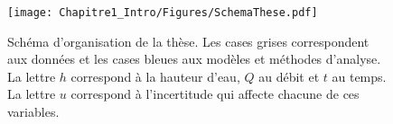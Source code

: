 \begin{figure}[h]
	\centering
	\texttt{[image: Chapitre1\_Intro/Figures/SchemaThese.pdf]}	
	\caption{Schéma d'organisation de la thèse. Les cases grises correspondent aux données et les cases bleues aux modèles et méthodes d'analyse. La lettre $h$ correspond à la hauteur d'eau, $Q$ au débit et $t$ au temps. La lettre $u$ correspond à l'incertitude qui affecte chacune de ces variables.}
	\label{fig:SchemaThese}
\end{figure}

\FloatBarrier

%
